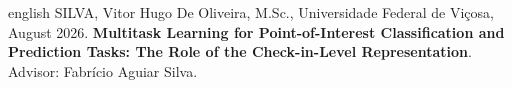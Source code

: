     \begin{resumo}[Abstract]
        \begin{otherlanguage*}{english}
            \singlespacing
            SILVA, Vitor Hugo De Oliveira, M.Sc., Universidade Federal de Viçosa, August 2026.
            \textbf{Multitask Learning for Point-of-Interest Classification and Prediction Tasks: The Role of the Check-in-Level Representation}. Advisor: Fabrício Aguiar Silva.
            \vspace{\onelineskip}


\end{otherlanguage*}
\end{resumo}

